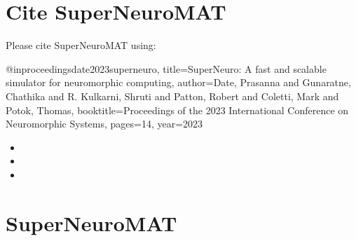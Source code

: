 \documentclass[letterpaper,10pt,english]{sphinxmanual}
\begin{document}
\chapter{Cite SuperNeuroMAT}
\label{\detokenize{index:cite-superneuromat}}
\sphinxAtStartPar
Please cite SuperNeuroMAT using:

\begin{sphinxVerbatim}[commandchars=\\\{\}]
@inproceedings\PYGZob{}date2023superneuro,
  title=\PYGZob{}SuperNeuro: A fast and scalable simulator for neuromorphic computing\PYGZcb{},
  author=\PYGZob{}Date, Prasanna and Gunaratne, Chathika and R. Kulkarni, Shruti and Patton, Robert and Coletti, Mark and Potok, Thomas\PYGZcb{},
  booktitle=\PYGZob{}Proceedings of the 2023 International Conference on Neuromorphic Systems\PYGZcb{},
  pages=\PYGZob{}1\PYGZhy{}\PYGZhy{}4\PYGZcb{},
  year=\PYGZob{}2023\PYGZcb{}
\PYGZcb{}
\end{sphinxVerbatim}
\begin{description}
\begin{itemize}
\item {} 
\sphinxAtStartPar
{}

\item {} 
\sphinxAtStartPar
{}

\item {} 
\sphinxAtStartPar
{}

\end{itemize}

\end{description}


\chapter{SuperNeuroMAT}
\label{\detokenize{index:module-superneuromat}}\label{\detokenize{index:superneuromat}}
\end{document}
